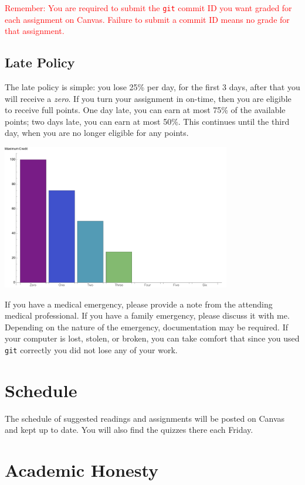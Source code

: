 \documentclass{article}
\begin{document}
\textcolor{red}{Remember: You are required to submit the \texttt{git} commit ID
you want graded for each assignment on Canvas. Failure to submit a commit ID
means no grade for that assignment.}

\subsection{Late Policy}
The late policy is simple: you lose 25\% per day, for the first 3 days, after
that you will receive a \emph{zero}. If you turn your assignment in on-time,
then you are eligible to receive full points. One day late, you can earn at most
75\% of the available points; two days late, you can earn at most 50\%. This
continues until the third day, when you are no longer eligible for any points.

\centerline{\includegraphics[width=0.75\textwidth]{Tardiness.pdf}}

If you have a medical emergency, please provide a note from the attending
medical professional. If you have a family emergency, please discuss it with me.
Depending on the nature of the emergency, documentation may be required. If your
computer is lost, stolen, or broken, you can take comfort that since you used
\texttt{git} correctly you did not lose any of your work.

\section{Schedule}

The schedule of suggested readings and assignments will be posted on Canvas and
kept up to date. You will also find the quizzes there each Friday.

\section{Academic Honesty}
\end{document}
